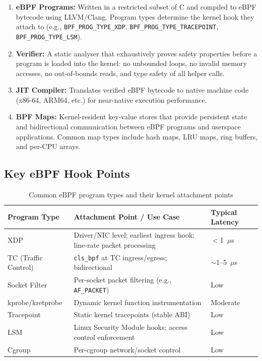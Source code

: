\begin{enumerate}
  \item \textbf{eBPF Programs:} Written in a restricted subset of C and compiled to
  eBPF bytecode using LLVM/Clang. Program types determine the kernel hook they attach to
  (e.g., \texttt{BPF\_PROG\_TYPE\_XDP}, \texttt{BPF\_PROG\_TYPE\_TRACEPOINT},
  \texttt{BPF\_PROG\_TYPE\_LSM}).

  \item \textbf{Verifier:} A static analyser that exhaustively proves safety properties
  before a program is loaded into the kernel: no unbounded loops, no invalid memory
  accesses, no out-of-bounds reads, and type safety of all helper calls.

  \item \textbf{JIT Compiler:} Translates verified eBPF bytecode to native machine code
  (x86-64, ARM64, etc.) for near-native execution performance.

  \item \textbf{BPF Maps:} Kernel-resident key-value stores that provide persistent state
  and bidirectional communication between eBPF programs and userspace applications.
  Common map types include hash maps, LRU maps, ring buffers, and per-CPU arrays.
\end{enumerate}

\subsection{Key eBPF Hook Points}
\label{subsec:ebpf_hooks}

\begin{table}[h]
\centering
\caption{Common eBPF program types and their kernel attachment points}
\label{tab:ebpf_hooks}
\begin{tabularx}{\textwidth}{lXl}
\toprule
\textbf{Program Type} & \textbf{Attachment Point / Use Case} & \textbf{Typical Latency} \\
\midrule
XDP & Driver/NIC level; earliest ingress hook; line-rate packet processing & $<$1~$\mu$s \\
TC (Traffic Control) & \texttt{cls\_bpf} at TC ingress/egress; bidirectional & $\sim$1--5~$\mu$s \\
Socket Filter & Per-socket packet filtering (e.g., \texttt{AF\_PACKET}) & Low \\
kprobe/kretprobe & Dynamic kernel function instrumentation & Moderate \\
Tracepoint & Static kernel tracepoints (stable ABI) & Low \\
LSM & Linux Security Module hooks; access control enforcement & Low \\
Cgroup & Per-cgroup network/socket control & Low \\
\bottomrule
\end{tabularx}
\end{table}

